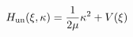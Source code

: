 \begin{equation}
\label{Eq:xi-Hun}
H_{\rm un}(\xi,\kappa)=\frac{1}{2\mu}\kappa^{2}+V(\xi)
\end{equation}


